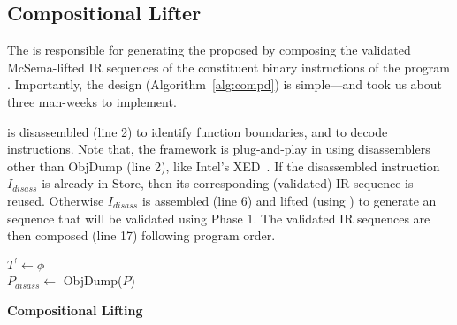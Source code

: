 \subsection{Compositional Lifter}\label{sec:compd}
The \compd is responsible for generating the proposed \LLVM {} by
composing the validated McSema-lifted IR sequences of the constituent binary
instructions of the \ISA program . Importantly, the \compd design 
(Algorithm~\ref{alg:compd}) is simple---and took us about 
three man-weeks to implement. 

 is disassembled (line 2) to
identify function boundaries, and to decode 
instructions.
Note that, the framework 
is
plug-and-play in
using disassemblers other than ObjDump (line 2), like Intel's  XED~\cite{xed}.
If the disassembled instruction $I_{disass}$ is already in Store, then its
corresponding (validated) IR sequence is reused.
Otherwise $I_{disass}$
is assembled (line 6) and lifted (using \mcsema) to
generate an \LLVM sequence that will be validated using Phase 1. The validated IR 
sequences are then composed (line 17) following program order.

\begin{algorithm}
    \BlankLine
    $T^\prime \gets \phi$ \\
    $P_{disass} \gets$ ObjDump($P$) \\
    \caption{\textbf{Compositional Lifting}}\label{alg:compd}
\end{algorithm}


